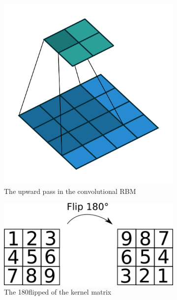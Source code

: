 \begin{figure}
	\centering
	\begin{subfigure}[t]{.30\textwidth}
  		\centering
  		\includegraphics[width=.8\linewidth]{imgs/crbm_padding1.png}
  		\caption{The upward pass in the convolutional RBM}
  		\label{fig:sub1}
	\end{subfigure}%
	\begin{subfigure}[t]{.30\textwidth}
  		\centering
  		\includegraphics[width=.8\linewidth]{imgs/kernel_flip.png}
  		\caption{The 180\textdegree  flipped of the kernel matrix}
  		\label{fig:sub2}
	\end{subfigure}
	\begin{subfigure}[t]{.30\textwidth}
  		\centering

\end{subfigure}
\end{figure}
